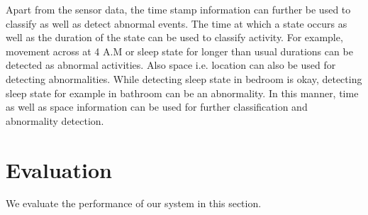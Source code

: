 \documentclass[10pt, conference, compsocconf]{IEEEtran}
\begin{document}
Apart from the sensor data, the time stamp information can further be used to classify as well as detect abnormal events. The time at which a state occurs as well as the duration of the state can be used to classify activity. For example, movement across at 4 A.M or sleep state for longer than usual durations can be detected as abnormal activities. Also space i.e. location can also be used for detecting abnormalities. While detecting sleep state in bedroom is okay, detecting sleep state for example in bathroom can be an abnormality. In this manner, time as well as space information can be used for further classification and abnormality detection.
%
%


\section{Evaluation}
We evaluate the performance of our system in this section. 
\end{document}
